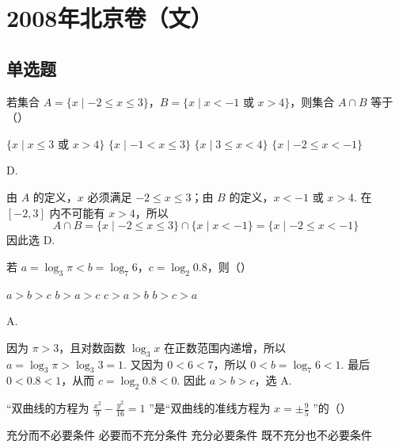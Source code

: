 \chapter{2008年北京卷（文）}

\section{单选题}

\begin{problem}
若集合 \(A = \{x \mid -2 \leqslant x \leqslant 3\}\)，\(B = \{x \mid x < -1\text{ 或 }x > 4\}\)，则集合 \(A \cap B\) 等于（\quad）

\choices
    {\(\{x\mid x\leqslant 3\text{\ 或\ }x > 4\}\)}
    {\(\{x\mid -1 < x\leqslant 3\}\)}
    {\(\{x\mid 3\leqslant x < 4\}\)}
    {\(\{x\mid -2\leqslant x < -1\}\)}
\end{problem}

\begin{answer}
D.
\end{answer}

\begin{solution}
由 \(A\) 的定义，\(x\) 必须满足 \(-2\leqslant x\leqslant3\)；由 \(B\) 的定义，\(x<-1\) 或 \(x>4\). 在 \([-2,3]\) 内不可能有 \(x>4\)，所以
\[
A\cap B=\{x\mid -2\leqslant x\leqslant3\}\cap\{x\mid x<-1\}=\{x\mid -2\leqslant x<-1\}
\]
因此选 D.
\end{solution}

\begin{problem}
若 \(a = \log_3 \pi < b = \log_7 6\)，\(c = \log_2 0.8\)，则（\quad）

\choices
    {\(a > b > c\)}
    {\(b > a > c\)}
    {\(c > a > b\)}
    {\(b > c > a\)}
\end{problem}

\begin{answer}
A.
\end{answer}

\begin{solution}
因为 \(\pi>3\)，且对数函数 \(\log_3 x\) 在正数范围内递增，所以
\(a=\log_3\pi>\log_3 3=1\). 又因为 \(0<6<7\)，所以
\(0<b=\log_7 6<1\). 最后 \(0<0.8<1\)，从而 \(c=\log_2 0.8<0\). 因此
\(a>b>c\)，选 A.
\end{solution}

\begin{problem}
“双曲线的方程为 \( \frac{x^{2}}{9}-\frac{y^{2}}{16}=1 \) ”是“双曲线的准线方程为 \( x=\pm\frac{9}{5} \) ”的（\quad）

\choices
    {充分而不必要条件}
    {必要而不充分条件}
    {充分必要条件}
    {既不充分也不必要条件}
\end{problem}

